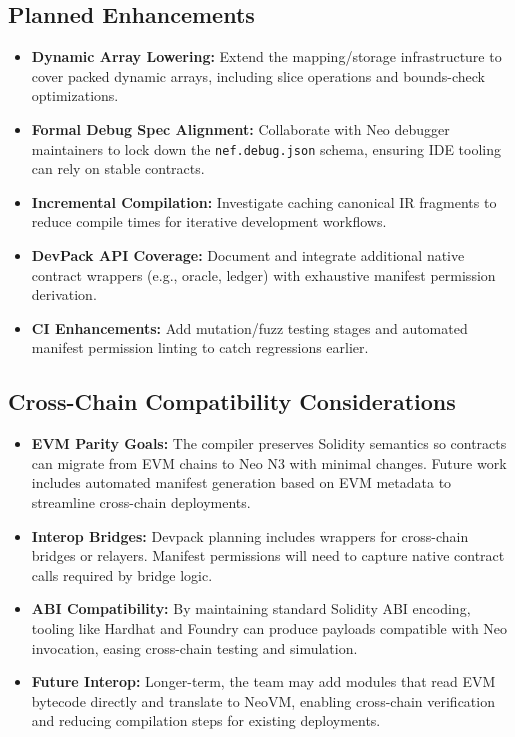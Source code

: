 \documentclass[11pt]{article}
\begin{document}
\subsection{Planned Enhancements}
\begin{itemize}
    \item \textbf{Dynamic Array Lowering:} Extend the mapping/storage infrastructure to cover packed dynamic arrays, including slice operations and bounds-check optimizations.
    \item \textbf{Formal Debug Spec Alignment:} Collaborate with Neo debugger maintainers to lock down the \texttt{nef.debug.json} schema, ensuring IDE tooling can rely on stable contracts.
    \item \textbf{Incremental Compilation:} Investigate caching canonical IR fragments to reduce compile times for iterative development workflows.
    \item \textbf{DevPack API Coverage:} Document and integrate additional native contract wrappers (e.g., oracle, ledger) with exhaustive manifest permission derivation.
    \item \textbf{CI Enhancements:} Add mutation/fuzz testing stages and automated manifest permission linting to catch regressions earlier.
\end{itemize}

\subsection{Cross-Chain Compatibility Considerations}
\begin{itemize}
    \item \textbf{EVM Parity Goals:} The compiler preserves Solidity semantics so contracts can migrate from EVM chains to Neo N3 with minimal changes. Future work includes automated manifest generation based on EVM metadata to streamline cross-chain deployments.
    \item \textbf{Interop Bridges:} Devpack planning includes wrappers for cross-chain bridges or relayers. Manifest permissions will need to capture native contract calls required by bridge logic.
    \item \textbf{ABI Compatibility:} By maintaining standard Solidity ABI encoding, tooling like Hardhat and Foundry can produce payloads compatible with Neo invocation, easing cross-chain testing and simulation.
    \item \textbf{Future Interop:} Longer-term, the team may add modules that read EVM bytecode directly and translate to NeoVM, enabling cross-chain verification and reducing compilation steps for existing deployments.
\end{itemize}
\end{document}
